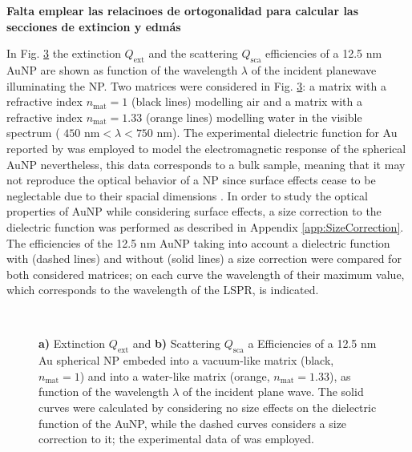 
\textbf{Falta emplear las relacinoes de ortogonalidad para calcular las secciones de extincion y edmás}
\clearpage


In Fig. \ref{fig:Mieefficiencies} the extinction  $Q_\text{ext}$ and the scattering  $Q_\text{sca}$ efficiencies of a 12.5 nm AuNP are shown as function of the wavelength $\lambda$ of the incident planewave illuminating the NP. Two matrices were considered in Fig. \ref{fig:Mieefficiencies}: a matrix with a refractive index $n_\text{mat} = 1$ (black lines) modelling air and a matrix with a refractive index $n_\text{mat} = 1.33$ (orange lines) modelling water in the visible spectrum ( $450\text{ nm} < \lambda < 750 \text{ nm}$).  The experimental dielectric function for Au reported by \citeauthor{johnson_optical_1972} \cite{johnson_optical_1972}  was employed to model the electromagnetic response of the spherical AuNP nevertheless, this data corresponds to a bulk sample, meaning that it may not reproduce the optical behavior of a NP since surface effects cease to be neglectable  due to their spacial dimensions \cite{noguez_surface_2007}.   In order to study  the optical properties of AuNP while considering  surface effects,  a size correction to the dielectric function was performed as described in Appendix \ref{app:SizeCorrection}. The efficiencies of the 12.5 nm AuNP  taking into account a dielectric function with (dashed lines) and without (solid lines) a size correction were compared for both considered matrices; on each curve the wavelength of their maximum value, which corresponds to the wavelength of the LSPR, is indicated.


 
\begin{figure}[h!]
	\def\svgwidth{1\textwidth} \small
\vspace*{3.25em}
\hspace*{-10.75em}
\begin{subfigure}{.49\textwidth}\caption{ }\label{fig:Mieefficiencies:a}\end{subfigure}
\begin{subfigure}{.49\textwidth}\caption{ }\label{fig:Mieefficiencies:b}\end{subfigure}
\vspace*{-6.25em}\\
\vspace*{-2em}
\caption[Extinction and Scattering Corss Section of a 12.5 nm Au spherical NP embeded into a vacuum- and into a waterlike environment]{ \textbf{a)} Extinction $Q_\text{ext}$ and \textbf{b)} Scattering $Q_\text{sca}$ a Efficiencies of a 12.5 nm Au spherical NP embeded into a vacuum-like matrix (black, $n_\text{mat} = 1$)  and into a water-like matrix (orange, $n_\text{mat} = 1.33$), as function of  the wavelength $\lambda$ of the incident plane wave.  The solid curves were calculated by considering no size effects on the dielectric function of the AuNP, while the dashed curves considers a size correction to it; the experimental data of \citeauthor{johnson_optical_1972} \cite{johnson_optical_1972} was employed.} 
\label{fig:Mieefficiencies} 
\end{figure}
 
